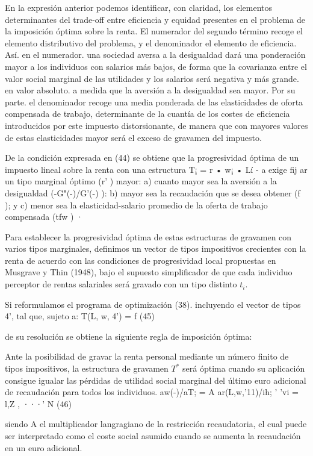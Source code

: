 \documentclass[10pt,a4paper]{article}
\begin{document}
En la expresión anterior podemos identificar, con claridad, los elementos determinantes del trade-off entre eficiencia y equidad presentes en el problema de la imposición óptima sobre la renta. El numerador del segundo término recoge el elemento distributivo del problema, y el denominador el elemento de eficiencia. Así. en el numerador. una sociedad aversa a la desigualdad dará una ponderación mayor a los individuos con salarios más bajos, de forma que la covarianza entre el valor social marginal de las utilidades y los salarios será negativa y más grande. en valor absoluto. a medida que la aversión a la desigualdad sea mayor. Por su parte. el denominador recoge una media ponderada de las elasticidades de oforta compensada de trabajo, determinante de la cuantía de los costes de eficiencia introducidos por este impuesto distorsionante, de manera que con mayores valores de estas elasticidades mayor será el exceso de gravamen del impuesto. 

De la condición expresada en (44) se obtiene que la progresividad óptima de un impuesto lineal sobre la renta con una estructura T¡ = r • w¡ • Lí - a exige fij ar un tipo marginal óptimo (r' ) mayor: a) cuanto mayor sea la aversión a la desigualdad (-G"(-)/G'(-) ): b) mayor sea la recaudación que se desea obtener (f ); y c) menor sea la elasticidad-salario promedio de la oferta de trabajo compensada (tfw ) ·

Para establecer la progresividad óptima de estas estructuras de gravamen con varios tipos marginales, definimos un vector de tipos impositivos crecientes con la renta de acuerdo con las condiciones de progresividad local propuestas en Musgrave y Thin (1948), bajo el supuesto simplificador de que cada individuo perceptor de rentas salariales será gravado con un tipo distinto $t_i$. 

Si reformulamos el programa de optimización (38). incluyendo el vector de tipos 4', tal que,
sujeto a: T(L, w, 4') = f (45)

de su resolución se obtiene la siguiente regla de imposición óptima: 


Ante la posibilidad de gravar la renta personal mediante un número finito de tipos impositivos, la estructura de gravamen $T^*$ será óptima cuando su aplicación consigue igualar las pérdidas de utilidad social marginal del último euro adicional de recaudación para todos los individuos. aw(-)/aT; = A ar(L,w,'11)/ih; ' 'vi = {l,Z , ···' N} (46)

siendo A el multiplicador langragiano de la restricción recaudatoria, el cual puede ser interpretado como el coste social asumido cuando se aumenta la recaudación en un euro adicional. 
\end{document}
